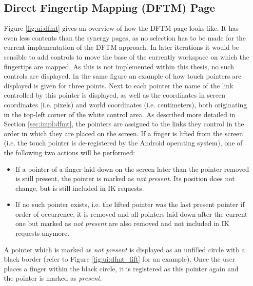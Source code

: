 \subsection{Direct Fingertip Mapping (DFTM) Page}

Figure \ref{fig:ui:dfmt} gives an overview of how the DFTM page looks like. It has even less contents than the synergy pages, as no selection has to be made for the current implementation of the DFTM approach. In later iterations it would be sensible to add controls to move the base of the currently workspace on which the fingertips are mapped. As this is not implemented within this thesis, no such controls are displayed. In the same figure an example of how touch pointers are displayed is given for three points. Next to each pointer the name of the link controlled by this pointer is displayed, as well as the coordinates in screen coordinates (i.e. pixels) and world coordinates (i.e. centimeters), both originating in the top-left corner of the white control area. As described more detailed in Section \ref{sec:impl:dfmt}, the pointers are assigned to the links they control in the order in which they are placed on the screen.
If a finger is lifted from the screen (i.e. the touch pointer is de-registered by the Android operating system), one of the following two actions will be performed:
\begin{itemize}
	\item If a pointer of a finger laid down on the screen later than the pointer removed is still present, the pointer is marked as \textit{not present}. Its position does not change, but is still included in IK requests. 
	\item If no such pointer exists, i.e. the lifted pointer was the last present pointer if order of occurrence, it is removed and all pointers laid down after the current one but marked as \textit{not present} are also removed and not included in IK requests anymore.
\end{itemize}

A pointer which is marked as \textit{not present} is displayed as an unfilled circle with a black border (refer to Figure \ref{fig:ui:dfmt_lift} for an example). Once the user places a finger within the black circle, it is registered as this pointer again and the pointer is marked as \textit{present}.

